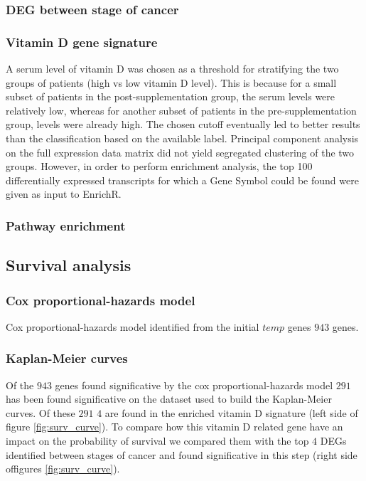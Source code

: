 \documentclass[fleqn,10pt]{SelfArx} %
\begin{document}
		\subsubsection{DEG between stage of cancer}

		\subsubsection{Vitamin D gene signature}
		A serum level of vitamin D was chosen as a threshold for stratifying the two groups of patients (high vs low vitamin D level). This is because for a small subset of patients in the post-supplementation group, the serum levels were relatively low, whereas for another subset of patients in the pre-supplementation group, levels were already high. The chosen cutoff eventually led to better results than the classification based on the available label.
		Principal component analysis on the full expression data matrix did not yield segregated clustering of the two groups.
		 However, in order to perform enrichment analysis, the top 100 differentially expressed transcripts for which a Gene Symbol could be found were given as input to EnrichR.



		\subsubsection{Pathway enrichment}

	\subsection{Survival analysis}

		\subsubsection{Cox proportional-hazards model}
		Cox proportional-hazards model identified from the initial $temp$ genes $943$ genes.

		\subsubsection{Kaplan-Meier curves}
		Of the $943$ genes found significative by the cox proportional-hazards model $291$ has been found significative on the dataset used to build the Kaplan-Meier curves.
		Of these $291$ $4$ are found in the enriched vitamin D signature (left side of figure \ref{fig:surv_curve}).
		To compare how this vitamin D related gene have an impact on the probability of survival we compared them with the top $4$ DEGs identified between stages of cancer and found significative in this step (right side offigures \ref{fig:surv_curve}).
\end{document}
